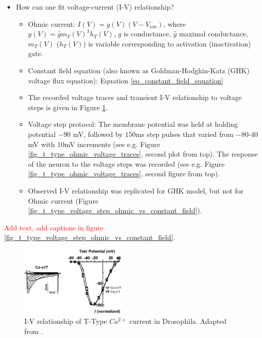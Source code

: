 \documentclass[../../workflow.tex]{subfiles}
\begin{document}
\begin{itemize}
    \item How can one fit voltage-current (I-V) relationship?
    \begin{itemize}
        \item Ohmic current: $I(V) = g(V) (V - V_{ion})$, where $g(V) = \hat{g} m_T(V)^3 h_T(V)$, $g$ is conductance,
        $\hat{g}$ maximal conductance, $m_T(V)$ ($h_T(V)$) is variable corresponding to
        activation (inactivation) gate.
        \item Constant field equation (also known as Goldman-Hodgkin-Katz (GHK) voltage flux equation): Equation \ref{eq_constant_field_equation}
        \item The recorded voltage traces and transient I-V relationship to voltage steps is given in Figure \ref{fig:i_v_relationship_jeong}.
        \item Voltage step protocol: The membrane potential was held at holding potential $-90$ mV,
        followed by $150$ms step pulses that varied from $-80$-$40$mV with $10$mV increments
        (see e.g. Figure \ref{fig_t_type_ohmic_voltage_traces}, second plot from top). The response
        of the neuron to the voltage steps was recorded (see e.g. Figure \ref{fig_t_type_ohmic_voltage_traces}, second figure from top).
        \item Observed I-V relationship was replicated for GHK model, but not for Ohmic current
        (Figure \ref{fig_t_type_voltage_step_ohmic_vs_constant_field}).
    \end{itemize}
\end{itemize}

\color{black}

\textcolor{red}{Add text, add captions in figure \ref{fig_t_type_voltage_step_ohmic_vs_constant_field}}.

\begin{figure}[H]
    \centering
    \includegraphics[width=0.45\textwidth]{./img/t_type_calcium_channel/iv_relationship_jeong_2015.png}
    \caption{I-V relationship of T-Type $Ca^{2+}$ current in Drosophila. Adapted from \parencite{jeongCaa1TFlyTtype2015}.}
    \label{fig:i_v_relationship_jeong}
\end{figure}
\end{document}
